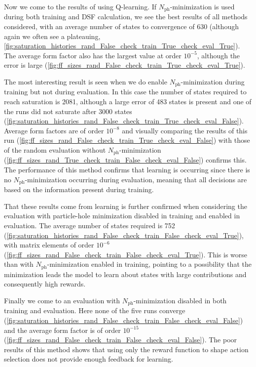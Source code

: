 \documentclass[11pt, a4paper]{report} %
\begin{document}
Now we come to the results of using Q-learning.
If \(N_{\mathrm{ph}}\)-minimization is used during both training and DSF calculation, we see the best results of all methods considered, with an average number of states to convergence of 630 (although again we often see a plateauing, \cref{fig:saturation_histories_rand_False_check_train_True_check_eval_True}).
The average form factor also has the largest value at order $10^{-5}$, although the error is large (\cref{fig:ff_sizes_rand_False_check_train_True_check_eval_True}).



The most interesting result is seen when we do enable \(N_{\mathrm{ph}}\)-minimization during training but not during evaluation.
In this case the number of states required to reach saturation is 2081, although a large error of 483 states is present and one of the runs did not saturate after 3000 states (\cref{fig:saturation_histories_rand_False_check_train_True_check_eval_False}).
Average form factors are of order \(10^{-8}\) and visually comparing the results of this run (\cref{fig:ff_sizes_rand_False_check_train_True_check_eval_False}) with those of the random evaluation without \(N_{\mathrm{ph}}\)-minimization (\cref{fig:ff_sizes_rand_True_check_train_False_check_eval_False}) confirms this.
The performance of this method confirms that learning is occurring since there is no \(N_{\mathrm{ph}}\)-minimization occurring during evaluation, meaning that all decisions are based on the information present during training.


That these results come from learning is further confirmed when considering the evaluation with particle-hole minimization disabled in training and enabled in evaluation.
The average number of states required is 752 (\cref{fig:saturation_histories_rand_False_check_train_False_check_eval_True}), with matrix elements of order \(10^{-6}\) (\cref{fig:ff_sizes_rand_False_check_train_False_check_eval_True}).
This is worse than with \(N_{\mathrm{ph}}\)-minimization enabled in training, pointing to a possibility that the minimization leads the model to learn about states with large contributions and consequently high rewards.

Finally we come to an evaluation with \(N_{\mathrm{ph}}\)-minimization disabled in both training and evaluation.
Here none of the five runs converge (\cref{fig:saturation_histories_rand_False_check_train_False_check_eval_False}) and the average form factor is of order \(10^{-15}\) (\cref{fig:ff_sizes_rand_False_check_train_False_check_eval_False}).
The poor results of this method shows that using only the reward function to shape action selection does not provide enough feedback for learning.
\end{document}
